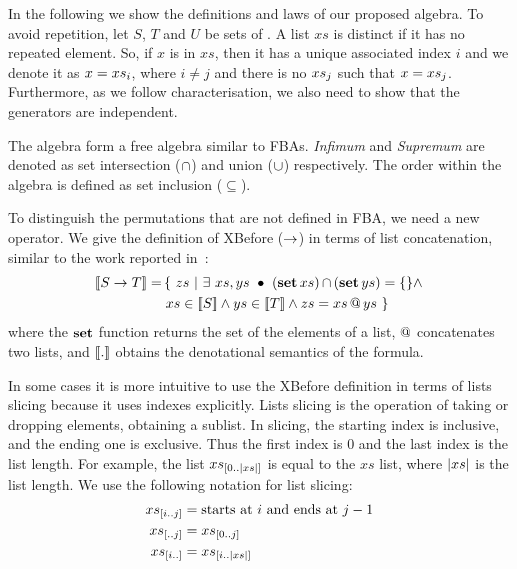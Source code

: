 
In the following we show the definitions and laws of our proposed \ac{algebra}.
To avoid repetition, let $S$, $T$ and $U$ be sets of \distinctlists.
A list $xs$ is distinct if it has no repeated element.
So, if $x$ is in $xs$, then it has a unique associated index $i$ and we denote it as $x = xs_{i}$, where $i \neq j$ and there is no $xs_{j}$ such that $x=xs_{j}$.
Furthermore, as we follow  characterisation, we also need to show that the generators are independent.

The \ac{algebra} form a free algebra similar to \acp{FBA}.
\emph{Infimum} and \emph{Supremum} are denoted as set intersection ($\operatorname{\cap}$) and union ($\operatorname{\cup}$) respectively.
The order within the algebra is defined as set inclusion ($\subseteq$).

To distinguish the permutations that are not defined in \ac{FBA}, we need a new operator.
We give the definition of \ac{XBefore} ($\rightarrow$) in terms of list concatenation, similar to the work reported in~\cite{DM2015}:
%
\begin{align}
\left[\!\left[S \rightarrow T\right]\!\right] = &
  \left\{~
    zs ~\middle|~ \exists~ xs, ys ~\bullet~ \left( \operatorname{\mathbf{set}} xs \right) \operatorname{\cap} \left( \operatorname{\mathbf{set}} ys \right) = \{\} \land \right.\nonumber\\
  & \left. xs \in \left[\!\left[S\right]\!\right] \land ys \in \left[\!\left[T\right]\!\right] \land zs = xs \operatorname{\mathbf{@}} ys
  ~\right\}\label{def:xbefore-append}
\end{align}
%
where the $\operatorname{\mathbf{set}}$ function returns the set of the elements of a list, $\operatorname{\mathbf{@}}$ concatenates two lists, and $\left[\!\left[.\right]\!\right]$ obtains the denotational semantics of the formula.

In some cases it is more intuitive to use the \ac{XBefore} definition in terms of lists slicing because it uses indexes explicitly.
Lists slicing is the operation of taking or dropping elements, obtaining a sublist.
In slicing, the starting index is inclusive, and the ending one is exclusive.
Thus the first index is 0 and the last index is the list length.
For example, the list $xs_{\left[0..\left|xs\right|\right]}$ is equal to the $xs$ list, where $\left|xs\right|$ is the list length.
We use the following notation for list slicing:
%
\begin{subequations}
\begin{align}
xs_{\left[i..j\right]} &= \text{starts at $i$ and ends at $j-1$}\label{def:slice}\\
xs_{\left[..j\right]} &= xs_{\left[0..j\right]}\label{def:slice-right}\\
xs_{\left[i..\right]} &= xs_{\left[i..\left|xs\right|\right]}\label{def:slice-left}
\end{align}
\end{subequations}


